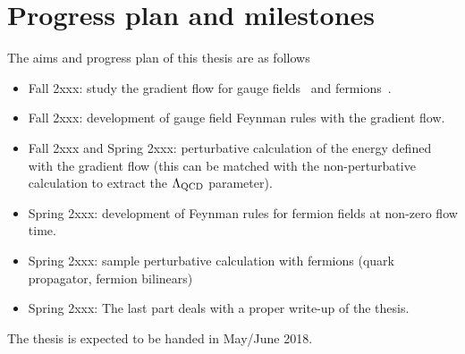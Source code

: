 \documentclass[aps,prc,twocolumn,showpacs,floatfix,nofootinbib,preprintnumbers,superscriptaddress,amsmath,amssymb]{revtex4-1}
\begin{document}
\section*{Progress plan and milestones}
The aims and progress plan of this thesis are as follows
\begin{itemize}
\item Fall 2xxx: study the gradient flow for gauge fields~\cite{Luscher:2010iy} and fermions~\cite{Luscher:2013cpa}.
\item Fall 2xxx: development of gauge field Feynman rules with the gradient flow.
\item Fall 2xxx and Spring 2xxx: perturbative calculation of the energy defined with the gradient flow (this can be matched
with the non-perturbative calculation to extract the $\Lambda_{\rm QCD}$ parameter).
\item Spring 2xxx: development of Feynman rules for fermion fields at non-zero flow time.
\item Spring 2xxx: sample perturbative calculation with fermions (quark propagator, fermion bilinears)
\item Spring 2xxx: The last part deals with a proper write-up of the thesis. 
\end{itemize}
 

The thesis is expected to be handed in May/June 2018.


%

\end{document}
